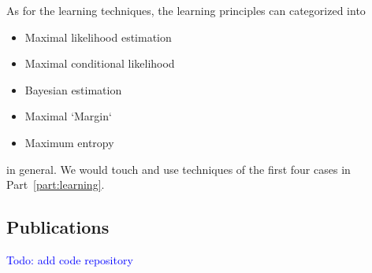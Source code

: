 As for the learning techniques, the learning principles can categorized into
\begin{itemize}
\item Maximal likelihood estimation
\item Maximal conditional likelihood
\item Bayesian estimation
\item Maximal `Margin`
\item Maximum entropy
\end{itemize}
in general. We would touch and use techniques of the first four cases in Part~\ref{part:learning}.

\subsection{Publications}
\textcolor{blue}{Todo: add code repository}

